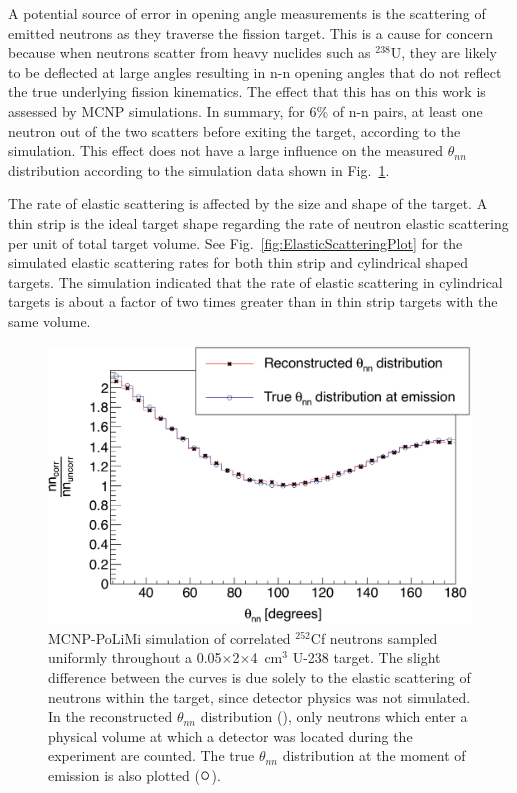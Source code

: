 \label{subsection:Elastic_scattering}
A potential source of error in opening angle measurements is the scattering of emitted neutrons as they traverse the fission target.
This is a cause for concern because when neutrons scatter from heavy nuclides such as $^{238}$U, they are likely to be deflected at large angles resulting in n-n opening angles that do not reflect the true underlying fission kinematics.
The effect that this has on this work is assessed by MCNP simulations.
In summary, for 6\% of n-n pairs, at least one neutron out of the two scatters before exiting the target, according to the simulation.
This effect does not have a large influence on the measured $\theta_{nn}$ distribution according to the simulation data shown in Fig.~\ref{fig:ElasticScatteringEffect}.

The rate of elastic scattering is affected by the size and shape of the target.
A thin strip is the ideal target shape regarding the rate of neutron elastic scattering per unit of total target volume.
See Fig.~\ref{fig:ElasticScatteringPlot} for the simulated elastic scattering rates for both thin strip and cylindrical shaped targets.
The simulation indicated that the rate of elastic scattering in cylindrical targets is about a factor of two times greater than in thin strip targets with the same volume.
\begin{figure}
    \centering
    \includegraphics[width = \figsize\textwidth]{EffectOfElasticScattering.png}
    \caption{
    MCNP-PoLiMi simulation of correlated $^{252}$Cf neutrons sampled uniformly throughout a 0.05$\times$2$\times$4~cm$^3$ U-238 target.
    The slight difference between the curves is due solely to the elastic scattering of neutrons within the target, since detector physics was not simulated.
    In the reconstructed $\theta_{nn}$ distribution ({\tiny {}}), only neutrons which enter a physical volume at which a detector was located during the experiment are counted.
   The true $\theta_{nn}$ distribution at the moment of emission is also plotted ($\mathlarger{\mathlarger{\mathlarger{\circ}}}$).
    }
    \label{fig:ElasticScatteringEffect}
\end{figure}
